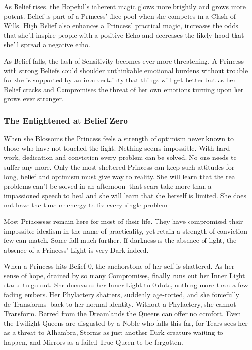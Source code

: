 As Belief rises, the Hopeful's inherent magic glows more brightly and grows more potent. Belief is part of a Princess' dice pool when she competes in a Clash of Wills. High Belief also enhances a Princess' practical magic, increases the odds that she'll inspire people with a positive Echo and decreases the likely hood that she'll spread a negative echo. 

As Belief falls, the lash of Sensitivity becomes ever more threatening. A Princess with strong Beliefs could shoulder unthinkable emotional burdens without trouble for she is supported by an iron certainty that things will get better but as her Belief cracks and Compromises the threat of her own emotions turning upon her grows ever stronger.  

\subsubsection*{The Enlightened at Belief Zero}

When she Blossoms the Princess feels a strength of optimism never known to those who have not touched the light. Nothing seems impossible. With hard work, dedication and conviction every problem can be solved. No one needs to suffer any more. Only the most sheltered Princess can keep such attitudes for long, belief and optimism must give way to reality. She will learn that the real problems can't be solved in an afternoon, that scars take more than a impassioned speech to heal and she will learn that she herself is limited. She does not have the time or energy to fix every single problem.

Most Princesses remain here for most of their life. They have compromised their impossible idealism in the name of practicality, yet retain a strength of conviction few can match. Some fall much further. If darkness is the absence of light, the absence of a Princess' Light is very Dark indeed.

When a Princess hits Belief 0, the anchorstone of her self is shattered. As her sense of hope, drained by so many Compromises, finally runs out her Inner Light starts to go out. She decreases her Inner Light to 0 dots, nothing more than a few fading embers. Her Phylactery shatters, suddenly age-rotted, and she forcefully de-Transforms, back to her normal identity. Without a Phylactery, she cannot Transform. Barred from the Dreamlands the Queens can offer no comfort. Even the Twilight Queens are disgusted by a Noble who falls this far, for Tears sees her as a threat to Alhambra, Storms as just another Dark creature waiting to happen, and Mirrors as a failed True Queen to be forgotten.

